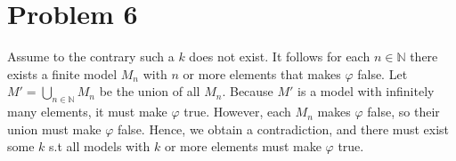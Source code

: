 \documentclass[10pt]{article}
\begin{document}
\section*{{Problem 6}}
Assume to the contrary such a $k$ does not exist.
It follows for each $n\in\mathbb{N}$ there exists a finite model $M_n$ with $n$ or more elements that makes $\varphi$ false.
Let $M'=\underset{n\in\mathbb{N}}{\bigcup}M_n$ be the union of all $M_n$. 
Because $M'$ is a model with infinitely many elements, it must make $\varphi$ true.
However, each $M_n$ makes $\varphi$ false, so their union must make $\varphi$ false.
Hence, we obtain a contradiction, and there must exist some $k$ s.t all models with $k$ or more elements must make $\varphi$ true.
\end{document}
